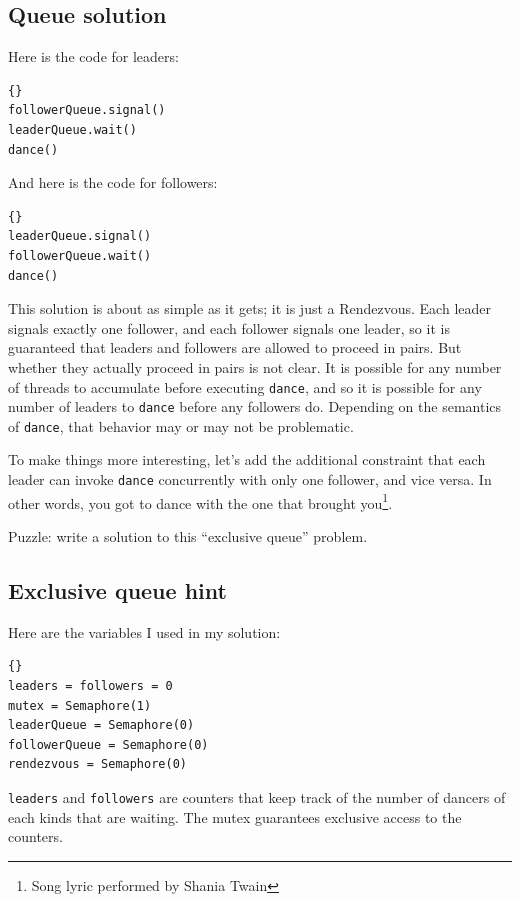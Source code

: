 \documentclass{book}
\begin{document}
\subsection {Queue solution}

Here is the code for leaders:

\newpage
\begin{lstlisting}[title={Queue solution (leaders)}]{}
followerQueue.signal()
leaderQueue.wait()
dance()
\end{lstlisting}

And here is the code for followers:

\begin{lstlisting}[title={Queue solution (followers)}]{}
leaderQueue.signal()
followerQueue.wait()
dance()
\end{lstlisting}

This solution is about as simple as it gets; it is just a Rendezvous.
Each leader signals exactly one follower, and each follower signals
one leader, so it is guaranteed that leaders and followers are
allowed to proceed in pairs.  But whether they actually proceed in
pairs is not clear.  It is possible for any number of threads to
accumulate before executing {\tt dance}, and so it is possible for
any number of leaders to {\tt dance} before any followers do.
Depending on the semantics of {\tt dance}, that behavior may or
may not be problematic.

To make things more interesting, let's add the additional constraint
that each leader can invoke {\tt dance} concurrently with only
one follower, and vice versa.  In other words, you got to dance
with the one that brought you\footnote{Song lyric performed by Shania
    Twain}.

Puzzle: write a solution to this ``exclusive queue'' problem.


\subsection {Exclusive queue hint}

Here are the variables I used in my solution:

\begin{lstlisting}[title={Queue hint}]{}
leaders = followers = 0
mutex = Semaphore(1)
leaderQueue = Semaphore(0)
followerQueue = Semaphore(0)
rendezvous = Semaphore(0)
\end{lstlisting}

{\tt leaders} and {\tt followers} are counters that
keep track of the number of dancers of each kinds that are
waiting.  The mutex guarantees exclusive access to the counters.
\end{document}

